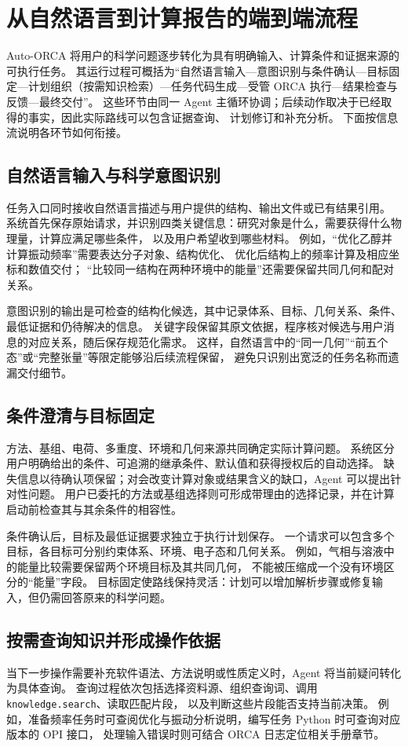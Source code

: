 \documentclass[UTF8,fontset=fandol,a4paper,11pt]{ctexart}
\newcommand{\code}[1]{\texttt{#1}}
\begin{document}
\section{从自然语言到计算报告的端到端流程}
\label{sec:end-to-end-workflow}
Auto-ORCA 将用户的科学问题逐步转化为具有明确输入、计算条件和证据来源的可执行任务。%
其运行过程可概括为“自然语言输入—意图识别与条件确认—目标固定—计划组织（按需知识检索）—任务代码生成—受管 ORCA
执行—结果检查与反馈—最终交付”。%
这些环节由同一 Agent 主循环协调；后续动作取决于已经取得的事实，因此实际路线可以包含证据查询、%
计划修订和补充分析。%
下面按信息流说明各环节如何衔接。

\subsection{自然语言输入与科学意图识别}
任务入口同时接收自然语言描述与用户提供的结构、输出文件或已有结果引用。%
系统首先保存原始请求，并识别四类关键信息：研究对象是什么，需要获得什么物理量，计算应满足哪些条件，%
以及用户希望收到哪些材料。%
例如，“优化乙醇并计算振动频率”需要表达分子对象、结构优化、%
优化后结构上的频率计算及相应坐标和数值交付；%
“比较同一结构在两种环境中的能量”还需要保留共同几何和配对关系。

意图识别的输出是可检查的结构化候选，其中记录体系、目标、几何关系、条件、最低证据和仍待解决的信息。%
关键字段保留其原文依据，程序核对候选与用户消息的对应关系，随后保存规范化需求。%
这样，自然语言中的“同一几何”“前五个态”或“完整张量”等限定能够沿后续流程保留，%
避免只识别出宽泛的任务名称而遗漏交付细节。

\subsection{条件澄清与目标固定}
方法、基组、电荷、多重度、环境和几何来源共同确定实际计算问题。%
系统区分用户明确给出的条件、可追溯的继承条件、默认值和获得授权后的自动选择。%
缺失信息以待确认项保留；对会改变计算对象或结果含义的缺口，Agent 可以提出针对性问题。%
用户已委托的方法或基组选择则可形成带理由的选择记录，并在计算启动前检查其与其余条件的相容性。

条件确认后，目标及最低证据要求独立于执行计划保存。%
一个请求可以包含多个目标，各目标可分别约束体系、环境、电子态和几何关系。%
例如，气相与溶液中的能量比较需要保留两个环境目标及其共同几何，%
不能被压缩成一个没有环境区分的“能量”字段。%
目标固定使路线保持灵活：计划可以增加解析步骤或修复输入，但仍需回答原来的科学问题。

\subsection{按需查询知识并形成操作依据}
\label{sec:knowledge-retrieval}
当下一步操作需要补充软件语法、方法说明或性质定义时，Agent 将当前疑问转化为具体查询。%
查询过程依次包括选择资料源、组织查询词、调用 \code{knowledge.search}、读取匹配片段，%
以及判断这些片段能否支持当前决策。%
例如，准备频率任务时可查阅优化与振动分析说明，编写任务 Python 时可查询对应版本的 OPI 接口，%
处理输入错误时则可结合 ORCA 日志定位相关手册章节。
\end{document}
